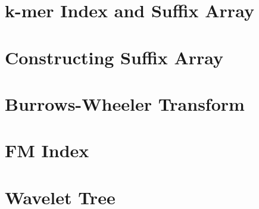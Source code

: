 \documentclass[nobib]{tufte-book}
\begin{document}
\chapter{k-mer Index and Suffix Array}


\chapter{Constructing Suffix Array}


\chapter{Burrows-Wheeler Transform}

\chapter{FM Index}

\chapter{Wavelet Tree}

\backmatter




\printindex
\end{document}
